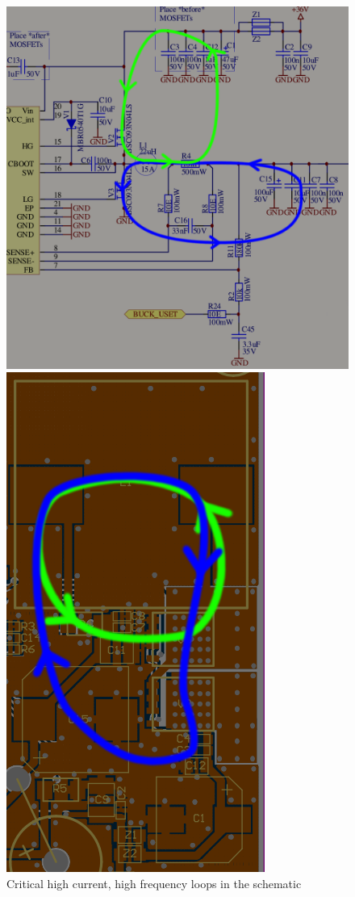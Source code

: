 \begin{figure}[th!]
    \centering
    \begin{minipage}{.4\textwidth}
        \centering
        \includegraphics[width=\textwidth]{images/circuit/schematic_high_current.png}
        \caption{Critical high current, high frequency loops in the schematic}
    \end{minipage}
    \begin{minipage}{.5\textwidth}
        \centering
        \includegraphics[width=.6\textwidth]{images/pcb/buck2.png}

\end{minipage}
\end{figure}

